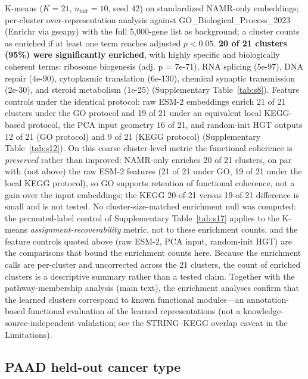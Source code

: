 \documentclass[11pt,a4paper]{article}
\newcommand{\supptab}[1]{Supplementary Table~\ref{#1}}
\begin{document}
K-means ($K=21$, $n_\text{init}=10$, seed 42) on standardized NAMR-only embeddings; per-cluster over-representation analysis against GO\_Biological\_Process\_2023 (Enrichr via gseapy) with the full 5,000-gene list as background; a cluster counts as enriched if at least one term reaches adjusted $p<0.05$. \textbf{20 of 21 clusters (95\%) were significantly enriched}, with highly specific and biologically coherent terms: ribosome biogenesis (adj. p = 7e-71), RNA splicing (5e-97), DNA repair (4e-90), cytoplasmic translation (6e-130), chemical synaptic transmission (2e-30), and steroid metabolism (1e-25) (\supptab{tab:s8}). Feature controls under the identical protocol: raw ESM-2 embeddings enrich 21 of 21 clusters under the GO protocol and 19 of 21 under an equivalent local KEGG-based protocol, the PCA input geometry 16 of 21, and random-init HGT outputs 12 of 21 (GO protocol) and 9 of 21 (KEGG protocol) (\supptab{tab:s12}). On this coarse cluster-level metric the functional coherence is \textit{preserved} rather than improved: NAMR-only enriches 20 of 21 clusters, on par with (not above) the raw ESM-2 features (21 of 21 under GO, 19 of 21 under the local KEGG protocol), so GO supports retention of functional coherence, not a gain over the input embeddings; the KEGG 20-of-21 versus 19-of-21 difference is small and is not tested. No cluster-size-matched enrichment null was computed: the permuted-label control of \supptab{tab:s17} applies to the K-means \emph{assignment-recoverability} metric, not to these enrichment counts, and the feature controls quoted above (raw ESM-2, PCA input, random-init HGT) are the comparisons that bound the enrichment counts here. Because the enrichment calls are per-cluster and uncorrected across the 21 clusters, the count of enriched clusters is a descriptive summary rather than a tested claim. Together with the pathway-membership analysis (main text), the enrichment analyses confirm that the learned clusters correspond to known functional modules---an annotation-based functional evaluation of the learned representations (not a knowledge-source-independent validation; see the STRING--KEGG overlap caveat in the Limitations).

\FloatBarrier



\FloatBarrier


\subsection{PAAD held-out cancer type}
\end{document}
